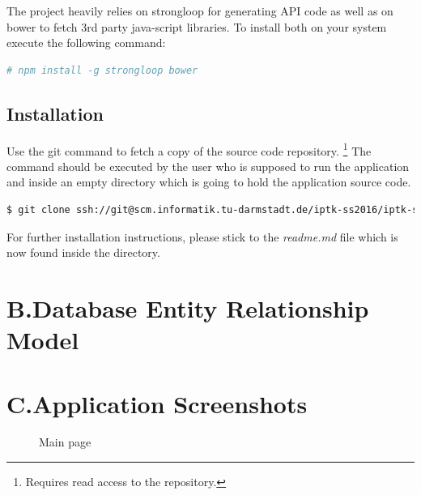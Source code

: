 \documentclass[nochapterpage,nopartpage,noheadingspace,numbersubsubsec,bigchapter,colorback,accentcolor=tud9c,10pt]{tudreport}
\begin{document}
    \noindent The project heavily relies on strongloop for generating API code as well as on bower to fetch 3rd party java-script libraries. To install both on your system execute the following command:
        \begin{lstlisting}[language=bash]
    # npm install -g strongloop bower
        \end{lstlisting}

  \section*{Installation}
  \label{sec:appendix:setup:install}

    \noindent Use the git command to fetch a copy of the source code repository.%
    \footnote{Requires read access to the repository.}
    The command should be executed by the user who is supposed to run the application and inside an empty directory which is going to hold the application source code.
        \begin{lstlisting}[language=bash]
    $ git clone ssh://git@scm.informatik.tu-darmstadt.de/iptk-ss2016/iptk-ss2016-team-whiskey.git .
        \end{lstlisting}
    For further installation instructions, please stick to the \emph{readme.md} file which is now found inside the directory.


  \chapter*{B.\quad Database Entity Relationship Model}


  \chapter*{C.\quad Application Screenshots}


        \begin{figure}
            \centering
            \caption{Main page}
            \label{fig:main-page}
        \end{figure}
\end{document}

